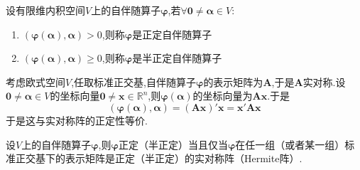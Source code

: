 \begin{formal}
    \begin{definition}[正定自伴随算子的定义]\label{def:正定自伴随算子的定义}
        设有限维内积空间$V$上的自伴随算子$\bm{\varphi}$,若$\forall\bm{0}\neq\bm{\alpha}\in V:$\begin{enumerate}[label={\textup{(\arabic*)}}]
            \item $\left(\bm{\varphi}\left(\bm{\alpha}\right),\bm{\alpha}\right)>0$,则称$\bm{\varphi}$是正定自伴随算子
            \item $\left(\bm{\varphi}\left(\bm{\alpha}\right),\bm{\alpha}\right)\geqslant0$,则称$\bm{\varphi}$是半正定自伴随算子
        \end{enumerate}
    \end{definition}
\end{formal}
\begin{brown}
    \begin{example}
        考虑欧式空间$V$,任取标准正交基,自伴随算子$\bm{\varphi}$的表示矩阵为$\bm{A}$,于是$\bm{A}$实对称.设$\bm{0}\neq\bm{\alpha}\in V$的坐标向量$\bm{0}\neq\bm{x}\in\mathbb{R}^n$,则$\bm{\varphi}\left(\bm{\alpha}\right)$的坐标向量为$\bm{Ax}$.于是\[
        \left(
            \bm{\varphi}\left(\bm{\alpha}\right),\bm{\alpha}
        \right)=\left(\bm{Ax}\right)'\bm{x}=\bm{x}'\bm{A}\bm{x}
        \]于是这与实对称阵的正定性等价.
    \end{example}
\end{brown}
\begin{formal}
    \begin{theorem}[自伴随算子正定的等价结论]\label{thm:自伴随算子正定的等价结论}
        设$V$上的自伴随算子$\bm{\varphi}$,则$\bm{\varphi}$正定（半正定）当且仅当$\bm{\varphi}$在任一组（或者某一组）标准正交基下的表示矩阵是正定（半正定）的实对称阵（\textup{Hermite}阵）.
    \end{theorem}
\end{formal}
